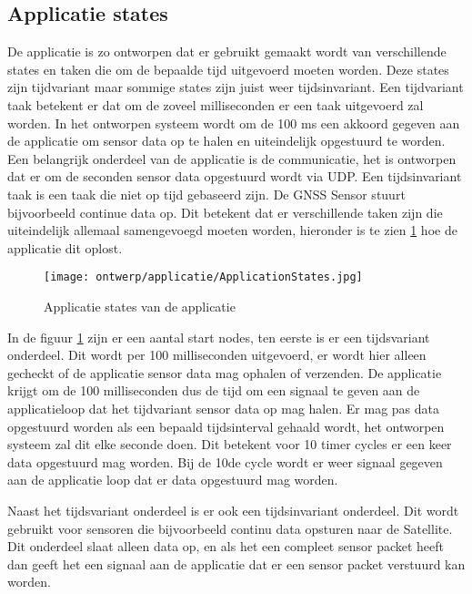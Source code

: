 \subsection{Applicatie states}
De applicatie is zo ontworpen dat er gebruikt gemaakt wordt van verschillende states en taken die om de bepaalde tijd uitgevoerd moeten worden. Deze states zijn tijdvariant maar sommige states zijn juist weer tijdsinvariant. Een tijdvariant taak betekent er dat om de zoveel milliseconden er een taak uitgevoerd zal worden. In het ontworpen systeem wordt om de 100 ms een akkoord gegeven aan de applicatie om sensor data op te halen en uiteindelijk opgestuurd te worden. Een belangrijk onderdeel van de applicatie is de communicatie, het is ontworpen dat er om de seconden sensor data opgestuurd wordt via UDP. Een tijdsinvariant taak is een taak die niet op tijd gebaseerd zijn. De GNSS Sensor stuurt bijvoorbeeld continue data op. Dit betekent dat er verschillende taken zijn die uiteindelijk allemaal samengevoegd moeten worden, hieronder is te zien \ref{fig:appstates} hoe de applicatie dit oplost. \newline

\begin{figure}[h!]
	\centering
	\label{fig:appstates}

	\texttt{[image: ontwerp/applicatie/ApplicationStates.jpg]}
	\caption{Applicatie states van de applicatie}
\end{figure}

\noindent In de figuur \ref{fig:appstates} zijn er een aantal start nodes, ten eerste is er een tijdsvariant onderdeel. Dit wordt per 100 milliseconden uitgevoerd, er wordt hier alleen gecheckt of de applicatie sensor data mag ophalen of verzenden. De applicatie krijgt om de 100 milliseconden dus de tijd om een signaal te geven aan de applicatieloop dat het tijdvariant sensor data op mag halen. Er mag pas data opgestuurd worden als een bepaald tijdsinterval gehaald wordt, het ontworpen systeem zal dit elke seconde doen. Dit betekent voor 10 timer cycles er een keer data opgestuurd mag worden. Bij de 10de cycle wordt er weer signaal gegeven aan de applicatie loop dat er data opgestuurd mag worden. \newline

\noindent Naast het tijdsvariant onderdeel is er ook een tijdsinvariant onderdeel. Dit wordt gebruikt voor sensoren die bijvoorbeeld continu data opsturen naar de Satellite. Dit onderdeel slaat alleen data op, en als het een compleet sensor packet heeft dan geeft het een signaal aan de applicatie dat er een sensor packet verstuurd kan worden. \newline

